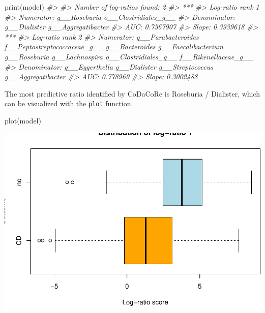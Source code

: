 \documentclass[
]{article}
\newenvironment{Shaded}{\begin{snugshade}}{\end{snugshade}}
\newcommand{\CommentTok}[1]{\textcolor[rgb]{0.56,0.35,0.01}{\textit{#1}}}
\newcommand{\FunctionTok}[1]{\textcolor[rgb]{0.00,0.00,0.00}{#1}}
\newcommand{\NormalTok}[1]{#1}
\begin{document}
\begin{Shaded}
\begin{Highlighting}[]
\FunctionTok{print}\NormalTok{(model)}
\CommentTok{\#\textgreater{} }
\CommentTok{\#\textgreater{} Number of log{-}ratios found: 2}
\CommentTok{\#\textgreater{} ***}
\CommentTok{\#\textgreater{} Log{-}ratio rank 1}
\CommentTok{\#\textgreater{} Numerator: g\_\_Roseburia o\_\_Clostridiales\_g\_\_}
\CommentTok{\#\textgreater{} Denominator: g\_\_Dialister g\_\_Aggregatibacter}
\CommentTok{\#\textgreater{} AUC: 0.7567907}
\CommentTok{\#\textgreater{} Slope: 0.3939618}
\CommentTok{\#\textgreater{} ***}
\CommentTok{\#\textgreater{} Log{-}ratio rank 2}
\CommentTok{\#\textgreater{} Numerator: g\_\_Parabacteroides f\_\_Peptostreptococcaceae\_g\_\_ g\_\_Bacteroides g\_\_Faecalibacterium g\_\_Roseburia g\_\_Lachnospira o\_\_Clostridiales\_g\_\_ f\_\_Rikenellaceae\_g\_\_}
\CommentTok{\#\textgreater{} Denominator: g\_\_Eggerthella g\_\_Dialister g\_\_Streptococcus g\_\_Aggregatibacter}
\CommentTok{\#\textgreater{} AUC: 0.778969}
\CommentTok{\#\textgreater{} Slope: 0.3002488}
\end{Highlighting}
\end{Shaded}

The most predictive ratio identified by CoDaCoRe is Roseburia /
Dialister, which can be visualized with the \texttt{plot} function.

\begin{Shaded}
\begin{Highlighting}[]
\FunctionTok{plot}\NormalTok{(model)}
\end{Highlighting}
\end{Shaded}

\includegraphics{guide_files/figure-latex/unnamed-chunk-10-1.pdf}
\end{document}
